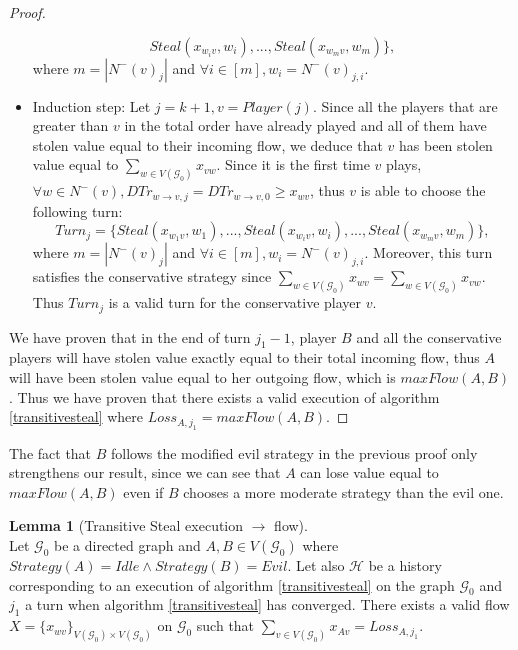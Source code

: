 \documentclass[11pt]{article}
\theoremstyle{definition}
\theoremstyle{corollary}
\theoremstyle{lemma}
\newtheorem{lemma}{Lemma}[section]
\begin{document}
\begin{proof}
\begin{itemize}
$$          Steal(x_{w_iv}, w_i), ..., Steal(x_{w_mv}, w_m)\},$$ where $m = |N^{-}(v)_j|$ and $\forall i \in [m], w_i =
          N^{-}(v)_{j, i}$.
          \item Induction step: Let $j = k + 1, v = Player(j)$. Since all the players that are greater than $v$ in the total
          order have already played and all of them have stolen value equal to their incoming flow, we deduce that $v$ has
          been stolen value equal to $\sum\limits_{w \in V(\mathcal{G}_0)}x_{vw}$. Since it is the first time $v$ plays,
          $\forall w \in N^{-}(v), DTr_{w \rightarrow v, j} = DTr_{w \rightarrow v, 0} \geq x_{wv}$, thus $v$ is able to
          choose the following turn: $$Turn_j = \{Steal(x_{w_1v}, w_1), ..., Steal(x_{w_iv}, w_i), ...,
          Steal(x_{w_mv}, w_m)\},$$ where $m = |N^{-}(v)_j|$ and $\forall i \in [m], w_i = N^{-}(v)_{j, i}$. Moreover, this
          turn satisfies the conservative strategy since $\sum\limits_{w \in V(\mathcal{G}_0)}x_{wv} = \sum\limits_{w \in
          V(\mathcal{G}_0)}x_{vw}$. Thus $Turn_j$ is a valid turn for the conservative player $v$.
       \end{itemize}
       We have proven that in the end of turn $j_1 - 1$, player $B$ and all the conservative players will have stolen value
       exactly equal to their total incoming flow, thus $A$ will have been stolen value equal to her outgoing flow, which is
       $maxFlow(A, B)$. Thus we have proven that there exists a valid execution of algorithm \ref{transitivesteal} where
       $Loss_{A, j_1} = maxFlow(A, B)$.
    \end{proof}
    The fact that $B$ follows the modified evil strategy in the previous proof only strengthens our result, since we can see
    that $A$ can lose value equal to $maxFlow(A, B)$ even if $B$ chooses a more moderate strategy than the evil one.
    \begin{lemma}[Transitive Steal execution $\rightarrow$ flow] \ \\
       \label{gameflow}
       Let $\mathcal{G}_0$ be a directed graph and $A, B \in V(\mathcal{G}_0)$ where $Strategy(A) = Idle \wedge Strategy(B) =
       Evil$. Let also $\mathcal{H}$ be a history corresponding to an execution of algorithm \ref{transitivesteal} on the
       graph $\mathcal{G}_0$ and $j_1$ a turn when algorithm \ref{transitivesteal} has converged. There exists a valid flow
       $X = \{x_{wv}\}_{V(\mathcal{G}_0) \times V(\mathcal{G}_0)}$ on $\mathcal{G}_0$ such that
       $\sum\limits_{v \in V(\mathcal{G}_0)}x_{Av} = Loss_{A, j_1}$.
    \end{lemma}
\end{document}
